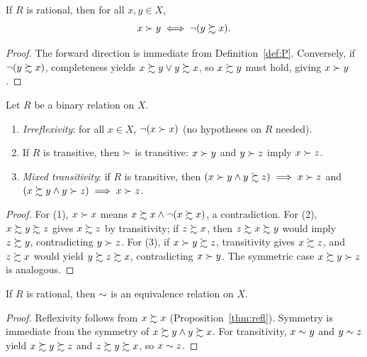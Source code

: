 \begin{lemma}
\label{lem:P_iff_not}
\leanok
{}
If $R$ is rational, then for all $x, y \in X$,
\[
  x \succ y \iff \neg(y \succsim x).
\]
\end{lemma}
\begin{proof}
\leanok
The forward direction is immediate from Definition~\ref{def:P}. Conversely, if
$\neg(y \succsim x)$, completeness yields $x \succsim y \lor y \succsim x$, so $x \succsim y$
must hold, giving $x \succ y$.
\end{proof}

\begin{proposition}
\label{thm:P_props}
\leanok
{}
Let $R$ be a binary relation on $X$.
\begin{enumerate}
  \item \emph{Irreflexivity}: for all $x \in X$, $\neg(x \succ x)$ (no hypotheses on $R$ needed).
  \item If $R$ is transitive, then $\succ$ is transitive: $x \succ y$ and $y \succ z$ imply $x \succ z$.
  \item \emph{Mixed transitivity}: if $R$ is transitive, then
        $(x \succ y \land y \succsim z) \implies x \succ z$ and
        $(x \succsim y \land y \succ z) \implies x \succ z$.
\end{enumerate}
\end{proposition}
\begin{proof}
\leanok
For (1), $x \succ x$ means $x \succsim x \land \neg(x \succsim x)$, a contradiction.
For (2), $x \succsim y \succsim z$ gives $x \succsim z$ by transitivity; if $z \succsim x$, then
$z \succsim x \succsim y$ would imply $z \succsim y$, contradicting $y \succ z$.
For (3), if $x \succ y \succsim z$, transitivity gives $x \succsim z$, and $z \succsim x$
would yield $y \succsim z \succsim x$, contradicting $x \succ y$. The symmetric case
$x \succsim y \succ z$ is analogous.
\end{proof}

\begin{proposition}
\label{thm:I_equiv}
\leanok
{}
If $R$ is rational, then $\sim$ is an equivalence relation on $X$.
\end{proposition}
\begin{proof}
\leanok
Reflexivity follows from $x \succsim x$ (Proposition~\ref{thm:refl}). Symmetry is immediate
from the symmetry of $x \succsim y \land y \succsim x$. For transitivity, $x \sim y$ and
$y \sim z$ yield $x \succsim y \succsim z$ and $z \succsim y \succsim x$, so $x \sim z$.
\end{proof}

